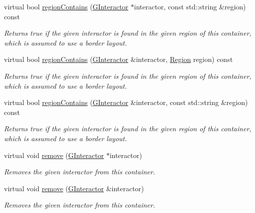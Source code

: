 \begin{DoxyCompactItemize}
virtual bool \mbox{\hyperlink{classsgl_1_1GContainer_a84a56bae6b8883d27e44d51c31b2bfc5}{region\+Contains}} (\mbox{\hyperlink{classsgl_1_1GInteractor}{G\+Interactor}} $\ast$interactor, const std\+::string \&region) const
\begin{DoxyCompactList}\small\item\em Returns true if the given interactor is found in the given region of this container, which is assumed to use a border layout. \end{DoxyCompactList}\item 
virtual bool \mbox{\hyperlink{classsgl_1_1GContainer_aa4cf95952747fd421a2b005eedbc662c}{region\+Contains}} (\mbox{\hyperlink{classsgl_1_1GInteractor}{G\+Interactor}} \&interactor, \mbox{\hyperlink{classsgl_1_1GContainer_a81a01a86de31071a92e6cce0bab9bc4b}{Region}} region) const
\begin{DoxyCompactList}\small\item\em Returns true if the given interactor is found in the given region of this container, which is assumed to use a border layout. \end{DoxyCompactList}\item 
virtual bool \mbox{\hyperlink{classsgl_1_1GContainer_ad67deacd62d3248fbe57ccbd4e96fb50}{region\+Contains}} (\mbox{\hyperlink{classsgl_1_1GInteractor}{G\+Interactor}} \&interactor, const std\+::string \&region) const
\begin{DoxyCompactList}\small\item\em Returns true if the given interactor is found in the given region of this container, which is assumed to use a border layout. \end{DoxyCompactList}\item 
virtual void \mbox{\hyperlink{classsgl_1_1GContainer_a1c12b1fde5c2ef10d79d4ee51e670efa}{remove}} (\mbox{\hyperlink{classsgl_1_1GInteractor}{G\+Interactor}} $\ast$interactor)
\begin{DoxyCompactList}\small\item\em Removes the given interactor from this container. \end{DoxyCompactList}\item 
virtual void \mbox{\hyperlink{classsgl_1_1GContainer_ade2376c458ac401a0bd2dbe44271509e}{remove}} (\mbox{\hyperlink{classsgl_1_1GInteractor}{G\+Interactor}} \&interactor)
\begin{DoxyCompactList}\small\item\em Removes the given interactor from this container. \end{DoxyCompactList}\item 

\end{DoxyCompactItemize}
